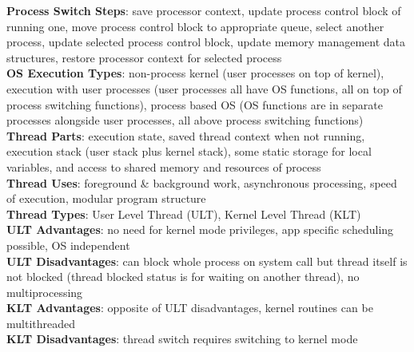 \documentclass[a4paper]{article}
\begin{document}
\begin{multicols}{2}
        \textbf{Process Switch Steps}: save processor context, update process control block of running one, move process control block to appropriate queue, select another process, update selected process control block, update memory management data structures, restore processor context for selected process\\
        \textbf{OS Execution Types}: non-process kernel (user processes on top of kernel), execution with user processes (user processes all have OS functions, all on top of process switching functions), process based OS (OS functions are in separate processes alongside user processes, all above process switching functions)\\
        \textbf{Thread Parts}: execution state, saved thread context when not running, execution stack (user stack plus kernel stack), some static storage for local variables, and access to shared memory and resources of process\\
        \textbf{Thread Uses}: foreground \& background work, asynchronous processing, speed of execution, modular program structure\\
        \textbf{Thread Types}: User Level Thread (ULT), Kernel Level Thread (KLT)\\
        \textbf{ULT Advantages}: no need for kernel mode privileges, app specific scheduling possible, OS independent\\
        \textbf{ULT Disadvantages}: can block whole process on system call but thread itself is not blocked (thread blocked status is for waiting on another thread), no multiprocessing\\
        \textbf{KLT Advantages}: opposite of ULT disadvantages, kernel routines can be multithreaded\\
        \textbf{KLT Disadvantages}: thread switch requires switching to kernel mode\\
    \end{multicols}
    
\end{document}
